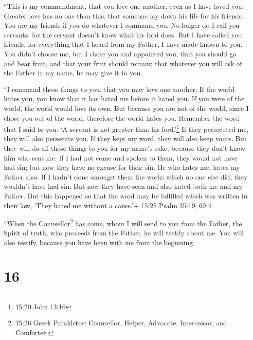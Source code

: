  ``This is my commandment, that you love one another, even
as I have loved you.  Greater love has no one than this,
that someone lay down his life for his friends.  You are my
friends if you do whatever I command you.  No longer do I
call you servants, for the servant doesn't know what his lord does. But
I have called you friends, for everything that I heard from my Father, I
have made known to you.  You didn't choose me, but I chose
you and appointed you, that you should go and bear fruit, and that your
fruit should remain; that whatever you will ask of the Father in my
name, he may give it to you.

 ``I command these things to you, that you may love one
another.  If the world hates you, you know that it has
hated me before it hated you.  If you were of the world,
the world would love its own. But because you are not of the world,
since I chose you out of the world, therefore the world hates you.
 Remember the word that I said to you: `A servant is not
greater than his lord.'\footnote{15:20 John 13:16} If they persecuted
me, they will also persecute you. If they kept my word, they will also
keep yours.  But they will do all these things to you for
my name's sake, because they don't know him who sent me. 
If I had not come and spoken to them, they would not have had sin; but
now they have no excuse for their sin.  He who hates me,
hates my Father also.  If I hadn't done amongst them the
works which no one else did, they wouldn't have had sin. But now they
have seen and also hated both me and my Father.  But this
happened so that the word may be fulfilled which was written in their
law, `They hated me without a cause.'+ 15:25 Psalm 35:19; 69:4

 ``When the Counsellor\footnote{15:26 Greek Parakletos:
  Counsellor, Helper, Advocate, Intercessor, and Comforter.} has come,
whom I will send to you from the Father, the Spirit of truth, who
proceeds from the Father, he will testify about me.  You
will also testify, because you have been with me from the beginning.

\hypertarget{section-15}{%
\section{16}\label{section-15}}


